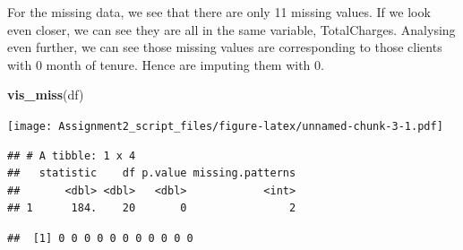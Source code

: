 \documentclass[
]{article}
\newenvironment{Shaded}{\begin{snugshade}}{\end{snugshade}}
\newcommand{\CommentTok}[1]{\textcolor[rgb]{0.56,0.35,0.01}{\textit{#1}}}
\newcommand{\DecValTok}[1]{\textcolor[rgb]{0.00,0.00,0.81}{#1}}
\newcommand{\FunctionTok}[1]{\textcolor[rgb]{0.13,0.29,0.53}{\textbf{#1}}}
\newcommand{\NormalTok}[1]{#1}
\newcommand{\OtherTok}[1]{\textcolor[rgb]{0.56,0.35,0.01}{#1}}
\newcommand{\SpecialCharTok}[1]{\textcolor[rgb]{0.81,0.36,0.00}{\textbf{#1}}}
\begin{document}
For the missing data, we see that there are only 11 missing values. If
we look even closer, we can see they are all in the same variable,
TotalCharges. Analysing even further, we can see those missing values
are corresponding to those clients with 0 month of tenure. Hence are
imputing them with 0.

\begin{Shaded}
\begin{Highlighting}[]
\FunctionTok{vis\_miss}\NormalTok{(df)}
\end{Highlighting}
\end{Shaded}

\texttt{[image: Assignment2\_script\_files/figure-latex/unnamed-chunk-3-1.pdf]}

\begin{Shaded}
\end{Shaded}

\begin{verbatim}
## # A tibble: 1 x 4
##   statistic    df p.value missing.patterns
##       <dbl> <dbl>   <dbl>            <int>
## 1      184.    20       0                2
\end{verbatim}

\begin{Shaded}
\end{Shaded}

\begin{verbatim}
##  [1] 0 0 0 0 0 0 0 0 0 0 0
\end{verbatim}

\begin{Shaded}
\end{Shaded}
\end{document}
